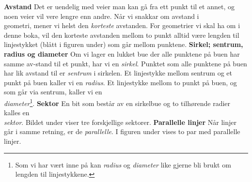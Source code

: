 \newpage
{}
\newpage
\textbf{Avstand}\os
Det er uendelig med veier man kan gå fra ett punkt til et annet, og noen veier vil vere lengre enn andre. Når vi snakkar om avstand i \\geometri, mener vi helst den \textsl{korteste} avstanden. For geometrier vi skal ha om i denne boka, vil den korteste avstanden mellom to punkt alltid være lengden til linjestykket (blått i figuren under) som går mellom punktene.
\textbf{Sirkel; sentrum, radius og diameter} \os
Om vi lager en lukket bue der alle punktene på buen har samme av-stand til et punkt, har vi en \textit{sirkel}. Punktet som alle punktene på buen har lik avstand til er \textit{sentrum} i sirkelen. Et linjestykke mellom sentrum og et punkt på buen kaller vi en \textit{radius}. Et linjestykke mellom to punkt på buen, og som går via sentrum, kaller vi en\\ \textit{diameter}\footnote{Som vi har vært inne på kan \textit{radius} og \textit{diameter} like gjerne bli brukt om lengden til linjestykkene.}.
\textbf{Sektor} \os
En bit som består av en sirkelbue og to tilhørende radier kalles en\\ \textit{sektor}. Bildet under viser tre forskjellige sektorer.
\newpage
\textbf{Parallelle linjer}\os
Når linjer går i samme retning, er de \textit{parallelle}. I figuren under vises to par med parallelle linjer.
